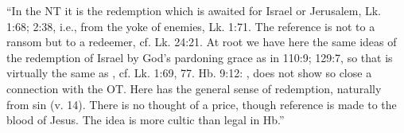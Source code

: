 				\begin{compactdesc}
					\item[TDNT] ``In the NT it is the redemption which is awaited for Israel or Jerusalem, Lk. 1:68;  2:38, i.e., from the yoke of enemies, Lk. 1:71. The reference is not to a ransom but to a redeemer, cf. Lk. 24:21. At root we have here the same ideas of the redemption of Israel by God’s pardoning grace as in  110:9; 129:7, so that  is virtually the same as , cf. Lk. 1:69, 77. Hb. 9:12: , does not show so close a connection with the OT. Here  has the general sense of redemption, naturally from sin (v. 14). There is no thought of a price, though reference is made to the blood of Jesus. The idea is more cultic than legal in Hb.'' 
				\end{compactdesc}
				
				
				\begin{compactdesc}
					\item[Some NT uses] \textbf{}
						\begin{compactdesc}
							\item[{\hyperref[LUKE-2-38]{Luke 2:38}}]
							\item[{\hyperref[HEBREWS-9-12]{Hebrews 9:12}}]
						\end{compactdesc}
				\end{compactdesc}
				
